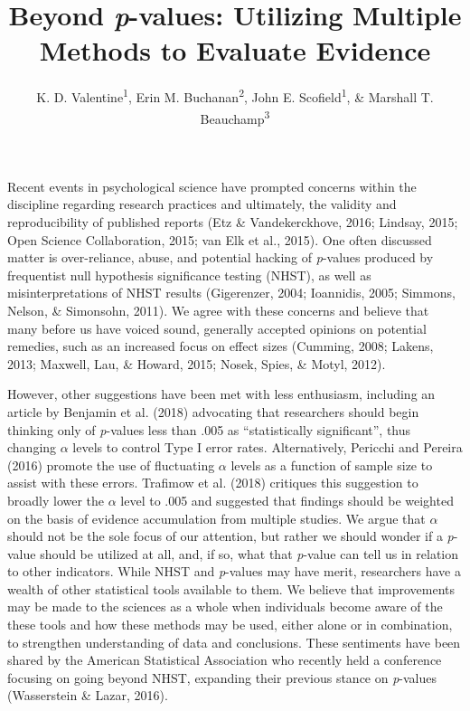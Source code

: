 \documentclass[,man, mask]{apa6}
\title{Beyond \emph{p}-values: Utilizing Multiple Methods to Evaluate Evidence}
\author{K. D. Valentine\textsuperscript{1}, Erin M. Buchanan\textsuperscript{2},
John E. Scofield\textsuperscript{1}, \& Marshall T.
Beauchamp\textsuperscript{3}}
\date{}
\affiliation{
\vspace{0.5cm}
\textsuperscript{1} University of Missouri\\\textsuperscript{2} Harrisburg University of Science and Technology\\\textsuperscript{3} University of Missouri - Kansas City}
\theoremstyle{definition}
\theoremstyle{definition}
\theoremstyle{definition}
\theoremstyle{remark}
\begin{document}
\maketitle

Recent events in psychological science have prompted concerns within the
discipline regarding research practices and ultimately, the validity and
reproducibility of published reports (Etz \& Vandekerckhove, 2016;
Lindsay, 2015; Open Science Collaboration, 2015; van Elk et al., 2015).
One often discussed matter is over-reliance, abuse, and potential
hacking of \emph{p}-values produced by frequentist null hypothesis
significance testing (NHST), as well as misinterpretations of NHST
results (Gigerenzer, 2004; Ioannidis, 2005; Simmons, Nelson, \&
Simonsohn, 2011). We agree with these concerns and believe that many
before us have voiced sound, generally accepted opinions on potential
remedies, such as an increased focus on effect sizes (Cumming, 2008;
Lakens, 2013; Maxwell, Lau, \& Howard, 2015; Nosek, Spies, \& Motyl,
2012).

However, other suggestions have been met with less enthusiasm, including
an article by Benjamin et al. (2018) advocating that researchers should
begin thinking only of \emph{p}-values less than .005 as
\enquote{statistically significant}, thus changing \(\alpha\) levels to
control Type I error rates. Alternatively, Pericchi and Pereira (2016)
promote the use of fluctuating \(\alpha\) levels as a function of sample
size to assist with these errors. Trafimow et al. (2018) critiques this
suggestion to broadly lower the \(\alpha\) level to .005 and suggested
that findings should be weighted on the basis of evidence accumulation
from multiple studies. We argue that \(\alpha\) should not be the sole
focus of our attention, but rather we should wonder if a \emph{p}-value
should be utilized at all, and, if so, what that \emph{p}-value can tell
us in relation to other indicators. While NHST and \emph{p}-values may
have merit, researchers have a wealth of other statistical tools
available to them. We believe that improvements may be made to the
sciences as a whole when individuals become aware of the these tools and
how these methods may be used, either alone or in combination, to
strengthen understanding of data and conclusions. These sentiments have
been shared by the American Statistical Association who recently held a
conference focusing on going beyond NHST, expanding their previous
stance on \emph{p}-values (Wasserstein \& Lazar, 2016).
\end{document}
